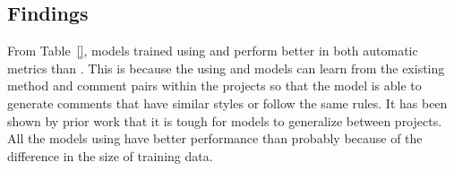 \subsection{Findings}
\label{sec:eval:findings}
From Table~\ref{}, models trained using \mixedproj \methodology and
\evoaware \methodology perform better in both automatic metrics than
\crossproj \methodology. This is because the using \mixedproj and
\evoaware \methodology models can learn from the
existing method and comment pairs within the projects so that the
model is able to generate comments that have similar styles or follow
the same rules. It has been shown by prior work that it is tough for
models to generalize between projects. All the models using \mixedproj
\methodology have better performance than \evoaware \methodology
probably because of the difference in the size of training data.



%
%
%
